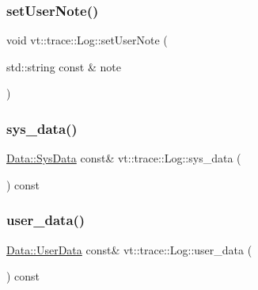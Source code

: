 \mbox{\label{structvt_1_1trace_1_1_log_a823483c0dc5480368e03e89774a0ae9d}} 
\subsubsection{\texorpdfstring{set\+User\+Note()}{setUserNote()}}
{\footnotesize\ttfamily void vt\+::trace\+::\+Log\+::set\+User\+Note (\begin{DoxyParamCaption}\item[{std\+::string const \&}]{note }\end{DoxyParamCaption})\hspace{0.3cm}{\ttfamily [inline]}}

\mbox{\label{structvt_1_1trace_1_1_log_a082937c397ac5b47ffc9089ff94698f0}} 
\subsubsection{\texorpdfstring{sys\+\_\+data()}{sys\_data()}}
{\footnotesize\ttfamily \hyperlink{structvt_1_1trace_1_1_log_1_1_data_1_1_sys_data}{Data\+::\+Sys\+Data} const\& vt\+::trace\+::\+Log\+::sys\+\_\+data (\begin{DoxyParamCaption}{ }\end{DoxyParamCaption}) const\hspace{0.3cm}{\ttfamily [inline]}}

\mbox{\label{structvt_1_1trace_1_1_log_a7b251bc7dcebcbbafa29cc2ca6ea4c12}} 
\subsubsection{\texorpdfstring{user\+\_\+data()}{user\_data()}}
{\footnotesize\ttfamily \hyperlink{structvt_1_1trace_1_1_log_1_1_data_1_1_user_data}{Data\+::\+User\+Data} const\& vt\+::trace\+::\+Log\+::user\+\_\+data (\begin{DoxyParamCaption}{ }\end{DoxyParamCaption}) const\hspace{0.3cm}{\ttfamily [inline]}}



